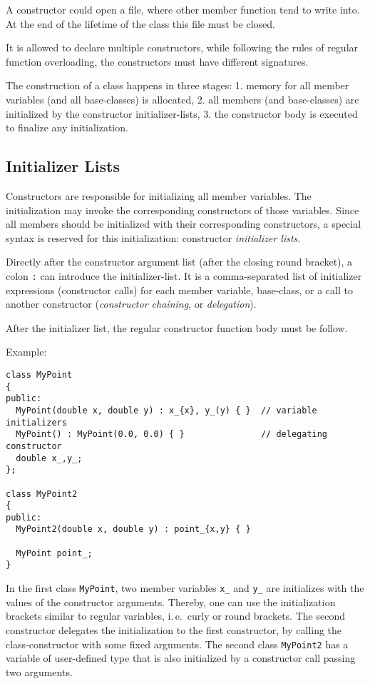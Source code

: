 \begin{example}
  A constructor could open a file, where other member function tend to write into. At the end of the lifetime of the class this file must be closed.
\end{example}

It is allowed to declare multiple constructors, while following the rules of regular function overloading, \ie the constructors must have different signatures.

The construction of a class happens in three stages: 1. memory for all member variables (and all base-classes) is allocated, 2. all members (and base-classes) are
initialized by the constructor initializer-lists, 3. the constructor body is executed to finalize any initialization.

\subsection{Initializer Lists}
Constructors are responsible for initializing all member variables. The initialization may invoke the corresponding constructors of those variables. Since all
members should be initialized with their corresponding constructors, a special syntax is reserved for this initialization: constructor \emph{initializer lists}.

Directly after the constructor argument list (after the closing round bracket), a colon \texttt{:} can introduce the initializer-list. It is a comma-separated
list of initializer expressions (constructor calls) for each member variable, base-class, or a call to another constructor (\emph{constructor chaining}, or
\emph{delegation}).

After the initializer list, the regular constructor function body must be follow.

Example:
\begin{verbatim}
class MyPoint
{
public:
  MyPoint(double x, double y) : x_{x}, y_(y) { }  // variable initializers
  MyPoint() : MyPoint(0.0, 0.0) { }               // delegating constructor
  double x_,y_;
};

class MyPoint2
{
public:
  MyPoint2(double x, double y) : point_{x,y} { }

  MyPoint point_;
}
\end{verbatim}
%
In the first class \texttt{MyPoint}, two member variables \texttt{x\_} and \texttt{y\_} are initializes with the values of the constructor arguments. Thereby,
one can use the initialization brackets similar to regular variables, i.\,e.\ curly or round brackets. The second constructor delegates the initialization to
the first constructor, by calling the class-constructor with some fixed arguments. The second class \texttt{MyPoint2} has a variable of user-defined type
that is also initialized by a constructor call passing two arguments.

